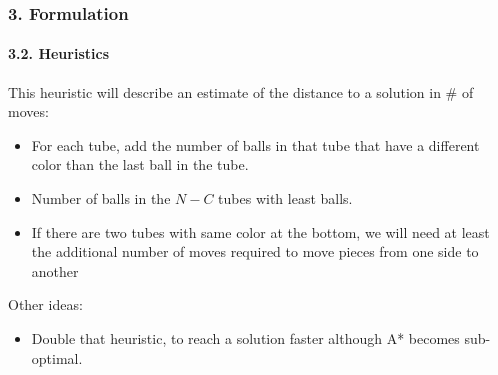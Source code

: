 \documentclass{beamer}
\begin{document}
\begin{frame}
  \frametitle{3. Formulation}
  \framesubtitle{3.2. Heuristics}
  This heuristic will describe an estimate of the distance to a solution in \# of moves:
  \begin{itemize}
    \item For each tube, add the number of balls in that tube that have a different color than the last ball in the tube.
    \item Number of balls in the $N-C$ tubes with least balls.
    \item If there are two tubes with same color at the bottom, we will need at least the additional number of moves required to move pieces from one side to another
  \end{itemize}

  Other ideas:
  \begin{itemize}
    \item Double that heuristic, to reach a solution faster although A* becomes sub-optimal.
  \end{itemize}
\end{frame}
\end{document}
